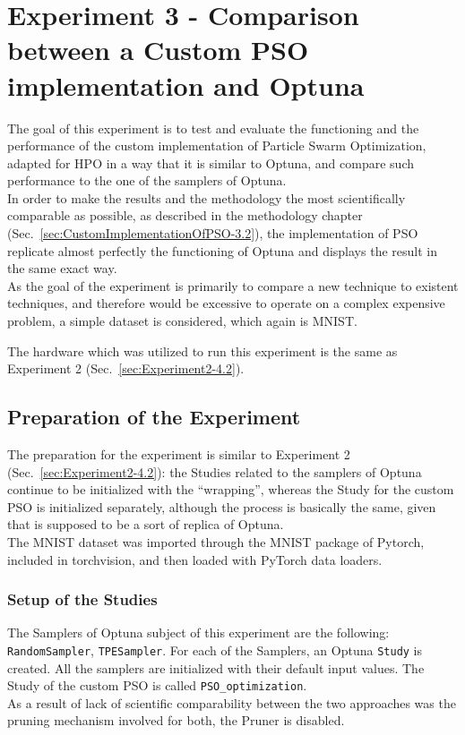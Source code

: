 \section{Experiment 3 - Comparison between a Custom PSO implementation and Optuna}

The goal of this experiment is to test and evaluate the functioning and the performance of the custom implementation of Particle Swarm Optimization, adapted for HPO in a way that it is similar to Optuna, and compare such performance to the one of the samplers of Optuna.
\\[0.3cm]In order to make the results and the methodology the most scientifically comparable as possible, as described in the methodology chapter (Sec.~\ref{sec:CustomImplementationOfPSO-3.2}), the implementation of PSO replicate almost perfectly the functioning of Optuna and displays the result in the same exact way.
\\[0.3cm]As the goal of the experiment is primarily to compare a new technique to existent techniques, and therefore would be excessive to operate on a complex expensive problem, a simple dataset is considered, which again is MNIST.

The hardware which was utilized to run this experiment is the same as Experiment 2 (Sec.~\ref{sec:Experiment2-4.2}).

\subsection{Preparation of the Experiment}

The preparation for the experiment is similar to Experiment 2 (Sec.~\ref{sec:Experiment2-4.2}): the Studies related to the samplers of Optuna continue to be initialized with the “wrapping”, whereas the Study for the custom PSO is initialized separately, although the process is basically the same, given that is supposed to be a sort of replica of Optuna. 
\\[0.3cm]The MNIST dataset was imported through the MNIST package of Pytorch, included in torchvision, and then loaded with PyTorch data loaders.

\subsubsection{Setup of the Studies}

The Samplers of Optuna subject of this experiment are the following: \texttt{RandomSampler}, \texttt{TPESampler}.
For each of the Samplers, an Optuna \texttt{Study} is created. All the samplers are initialized with their default input values.
The Study of the custom PSO is called \texttt{PSO\_optimization}.
\\[0.3cm]As a result of lack of scientific comparability between the two approaches was the pruning mechanism involved for both, the Pruner is disabled.

